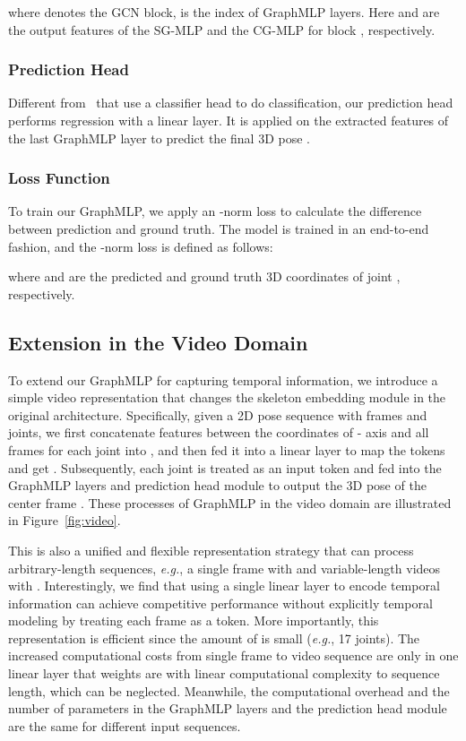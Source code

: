 \documentclass[lettersize,journal]{IEEEtran}
\begin{document}
where  denotes the GCN block,  is the index of GraphMLP layers. 
Here  and  are the output features of the SG-MLP and the CG-MLP for block , respectively.  

\subsubsection{Prediction Head}
Different from~\cite{vit,mlpmixer} that use a classifier head to do classification, our prediction head performs regression with a linear layer. 
It is applied on the extracted features  of the last GraphMLP layer to predict the final 3D pose . 

\subsubsection{Loss Function}
To train our GraphMLP, we apply an -norm loss to calculate the difference between prediction and ground truth. 
The model is trained in an end-to-end fashion, and the -norm loss is defined as follows:

where  and  are the predicted and ground truth 3D coordinates of joint , respectively. 

\subsection{Extension in the Video Domain}
To extend our GraphMLP for capturing temporal information, we introduce a simple video representation that changes the skeleton embedding module in the original architecture.  
Specifically, given a 2D pose sequence  with  frames and  joints, we first concatenate features between the coordinates of - axis and all frames for each joint into , and then fed it into a linear layer  to map the tokens and get . 
Subsequently, each joint is treated as an input token and fed into the GraphMLP layers and prediction head module to output the 3D pose of the center frame . 
These processes of GraphMLP in the video domain are illustrated in Figure~\ref{fig:video}. 

This is also a unified and flexible representation strategy that can process arbitrary-length sequences, \emph{e.g.}, a single frame with  and variable-length videos with . 
Interestingly, we find that using a single linear layer to encode temporal information can achieve competitive performance without explicitly temporal modeling by treating each frame as a token. 
More importantly, this representation is efficient since the amount of  is small (\emph{e.g.}, 17 joints). 
The increased computational costs from single frame to video sequence are only in one linear layer that weights are  with linear computational complexity to sequence length, which can be neglected. 
Meanwhile, the computational overhead and the number of parameters in the GraphMLP layers and the prediction head module are the same for different input sequences. 
\end{document}
